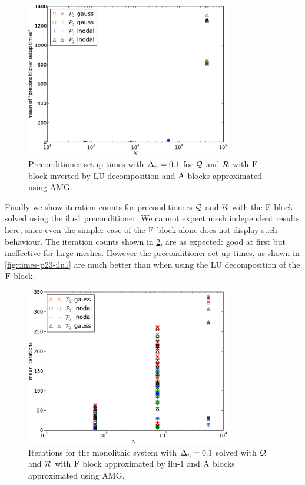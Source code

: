 \begin{figure}
  \centering
  \includegraphics[width=0.8\textwidth]{plots/linear_solvers_p2p3/implicitexact-meanofpreconditionersetuptimesvsinitialnnode.pdf}
  \caption{Preconditioner setup times with $\Delta_{n}=0.1$ for $\mathcal{Q}$ and $\mathcal{R}$ with $\mathrm{F}$ block inverted by LU decomposition and $\mathrm{A}$ blocks approximated using AMG.}
  \label{fig:times-p23-exact}
\end{figure}


Finally we show iteration counts for preconditioners $\mathcal{Q}$ and $\mathcal{R}$ with the $\mathrm{F}$ block solved using the ilu-1 preconditioner.
We cannot expect mesh independent results here, since even the simpler case of the $\mathrm{F}$ block alone does not display such behaviour.
The iteration counts shown in \cref{fig:its-p23-ilu1}, are as expected: good at first but ineffective for large meshes.
However the preconditioner set up times, as shown in \cref{fig:times-p23-ilu1} are much better than when using the LU decomposition of the $\mathrm{F}$ block. 

\begin{figure}
  \centering
  \includegraphics[width=0.8\textwidth]{plots/linear_solvers_p2p3/implicitilu-1-meanofnsolveritersvsinitialnnode.pdf}
  \caption{Iterations for the monolithic system with $\Delta_{n}=0.1$ solved with $\mathcal{Q}$ and $\mathcal{R}$ with $\mathrm{F}$ block approximated by ilu-1 and $\mathrm{A}$ blocks approximated using AMG.}
  \label{fig:its-p23-ilu1}
\end{figure}

